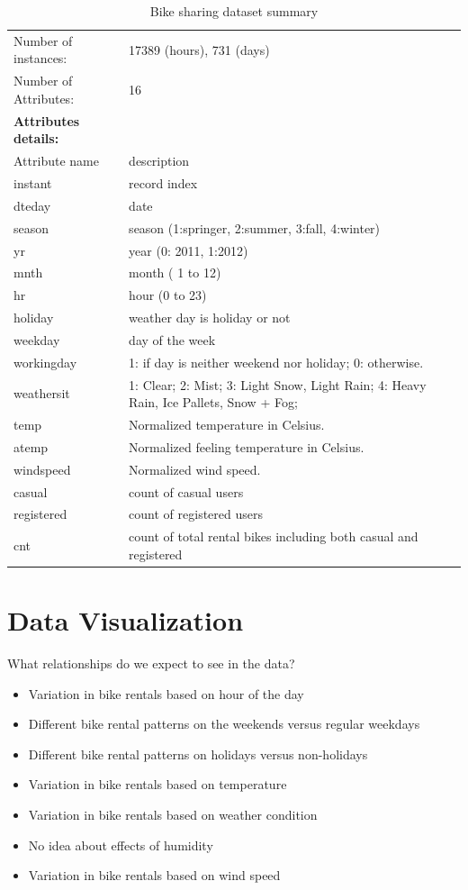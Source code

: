 \documentclass[12pt]{article}
\begin{document}
\begin{table}[H]
	\label{table:dataset}
	\begin{tabular}{| l | p{11cm} |} \hline
		Number of instances: & 17389 (hours), 731 (days)\\
		Number of Attributes: & 16\\ \hline \hline
		\textbf{Attributes details:} &\\ \hline
		Attribute name  & description\\ \hline
		instant   & record index\\ \hline
		dteday    & date\\ \hline
		season  & season (1:springer, 2:summer, 3:fall, 4:winter)\\ \hline
		yr    &  year (0: 2011, 1:2012)\\ \hline
		mnth &   month ( 1 to 12)\\ \hline
		hr & hour (0 to 23) \\ \hline
		holiday   & weather day is holiday or not \\ \hline
		weekday   &  day of the week \\ \hline
		workingday   & 1: if day is neither weekend nor holiday; 0: otherwise.\\ \hline
		weathersit   & 1: Clear; 2: Mist; 3: Light Snow, Light Rain; 4: Heavy Rain, Ice Pallets, Snow + Fog;\\ \hline
		temp   & Normalized temperature in Celsius. \\ \hline
		atemp    & Normalized feeling temperature in Celsius. \\ \hline
		windspeed   & Normalized wind speed. \\ \hline
		casual   & count of casual users\\ \hline
		registered   & count of registered users\\ \hline
		cnt   & count of total rental bikes including both casual and registered \\ \hline
	\end{tabular}
	\caption{Bike sharing dataset summary}
\end{table}
 
 
\section{Data Visualization}
\label{sec:visual}
 
What relationships do we expect to see in the data?
\begin{itemize}
	\item Variation in bike rentals based on hour of the day
	\item Different bike rental patterns on the weekends versus regular weekdays
	\item Different  bike rental patterns on holidays versus non-holidays
	\item Variation in bike rentals based on temperature
	\item Variation in bike rentals based on weather condition
	\item No idea about effects of humidity
	\item Variation in bike rentals based on wind speed
\end{itemize}
\end{document}
